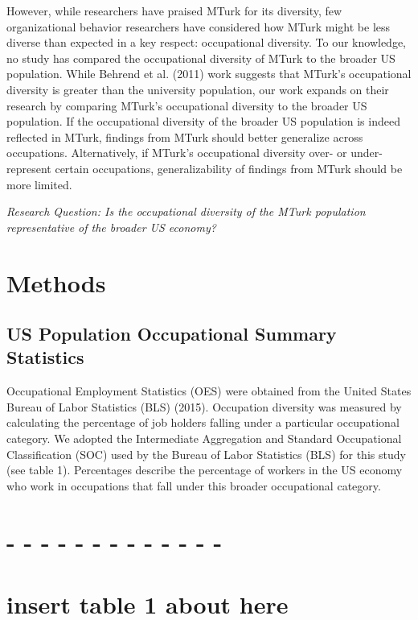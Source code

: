 \documentclass[english,man]{apa6}
\theoremstyle{definition}
\theoremstyle{definition}
\theoremstyle{remark}
\begin{document}
However, while researchers have praised MTurk for its diversity, few
organizational behavior researchers have considered how MTurk might be
less diverse than expected in a key respect: occupational diversity. To
our knowledge, no study has compared the occupational diversity of MTurk
to the broader US population. While Behrend et al. (2011) work suggests
that MTurk's occupational diversity is greater than the university
population, our work expands on their research by comparing MTurk's
occupational diversity to the broader US population. If the occupational
diversity of the broader US population is indeed reflected in MTurk,
findings from MTurk should better generalize across occupations.
Alternatively, if MTurk's occupational diversity over- or
under-represent certain occupations, generalizability of findings from
MTurk should be more limited.

\emph{Research Question: Is the occupational diversity of the MTurk
population representative of the broader US economy?}

\section{Methods}\label{methods}

\subsection{US Population Occupational Summary
Statistics}\label{us-population-occupational-summary-statistics}

Occupational Employment Statistics (OES) were obtained from the United
States Bureau of Labor Statistics (BLS) (2015). Occupation diversity was
measured by calculating the percentage of job holders falling under a
particular occupational category. We adopted the Intermediate
Aggregation and Standard Occupational Classification (SOC) used by the
Bureau of Labor Statistics (BLS) for this study (see table 1).
Percentages describe the percentage of workers in the US economy who
work in occupations that fall under this broader occupational category.

\section{- - - - - - - - - - - - -}\label{section}

\section{insert table 1 about here}\label{insert-table-1-about-here}
\end{document}
